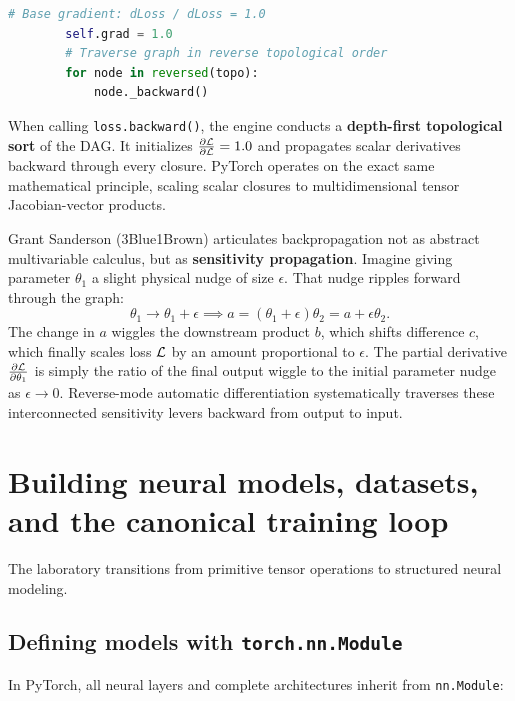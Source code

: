 \documentclass[../labs.tex]{subfiles}
\begin{document}
\begin{deepdive}
\begin{lstlisting}[language=Python, caption={Core structure of Andrej Karpathy's scalar autograd engine.}, label={lst:karpathy_micrograd}]
        # Base gradient: dLoss / dLoss = 1.0
        self.grad = 1.0
        # Traverse graph in reverse topological order
        for node in reversed(topo):
            node._backward()
\end{lstlisting}

When calling \texttt{loss.backward()}, the engine conducts a \textbf{depth-first topological sort} of the DAG. It initializes $\frac{\partial \mathcal{L}}{\partial \mathcal{L}} = 1.0$ and propagates scalar derivatives backward through every closure. PyTorch operates on the exact same mathematical principle, scaling scalar closures to multidimensional tensor Jacobian-vector products.
\end{deepdive}

\begin{intuition}
Grant Sanderson (3Blue1Brown) articulates backpropagation not as abstract multivariable calculus, but as \textbf{sensitivity propagation}.
Imagine giving parameter $\theta_1$ a slight physical nudge of size $\epsilon$. That nudge ripples forward through the graph:
\begin{equation}
\theta_1 \to \theta_1 + \epsilon \implies a = (\theta_1 + \epsilon)\theta_2 = a + \epsilon \theta_2.
\end{equation}
The change in $a$ wiggles the downstream product $b$, which shifts difference $c$, which finally scales loss $\mathcal{L}$ by an amount proportional to $\epsilon$. The partial derivative $\frac{\partial \mathcal{L}}{\partial \theta_1}$ is simply the ratio of the final output wiggle to the initial parameter nudge as $\epsilon \to 0$. Reverse-mode automatic differentiation systematically traverses these interconnected sensitivity levers backward from output to input.
\end{intuition}


\section{Building neural models, datasets, and the canonical training loop}

The laboratory transitions from primitive tensor operations to structured neural modeling.

\subsection{Defining models with \texttt{torch.nn.Module}}
In PyTorch, all neural layers and complete architectures inherit from \texttt{nn.Module}:
\end{document}
